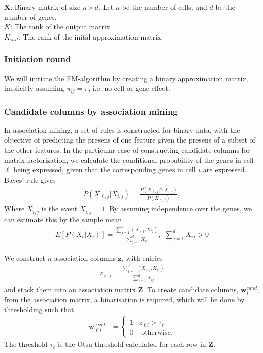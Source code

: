 \documentclass[12pt]{article}
\begin{document}
 $\mathbf{X}$: Binary matrix of size $n \times d$. Let $n$ be the number of cells, and $d$ be the number of genes.\\
$K$: The rank of the output matrix. \\
$K_{init}$: The rank of the inital approximation matrix.

\subsubsection{Initiation round} %
We will initiate the EM-algorithm by creating a binary approximation matrix, implicitly assuming $\pi_{ij} = \pi$, i.e. no cell or gene effect.

\subsubsection*{Candidate columns by association mining} %

In association mining\cite{Agrawal1993Mining}, a set of rules is constructed for binary data, with the objective of predicting the presens of one feature given the presens of a subset of the other features. 
In the particular case of constructing candidate columns for matrix factorization, we calculate the conditional probability of the genes in cell $\ell$ being expressed, given that the corresponding genes in cell $i$ are expressed. 
Bayes' rule gives
\begin{align}
  P(X_{\ell,j}|X_{i,j}) = \frac{P(X_{\ell,j} \cap X_{i,j})}{P(X_{\ell,j})}, 
\end{align}
Where $X_{i,j}$ is the event $X_{i,j} = 1$.
By assuming independence over the genes, we can estimate this by the sample mean 
\begin{align}
  E [ P(X_{\ell}| X_{i})] =  \frac{\sum_{j = 1}^ d (X_{\ell j}, X_{i j})}{\sum_{j = 1}^ d X_{i j}}, \, \, \sum_{j = 1}^ d X_{i j} > 0
\end{align}

We construct $n$ association columns $\mathbf{z}_i$ with entries
\begin{align}
  z_{\ell, i} = \frac{\sum_{j = 1}^ d (X_{\ell j}, X_{i j})}{\sum_{j = 1}^ d X_{i j}}
\end{align}
and stack them into an association matrix $\mathbf{Z}$.
To create candidate columns, $\mathbf{w}^{cand}_{ i}$,  from the association matrix, a binarisation is required, which will be done by thresholding such that
\begin{align}
  \mathbf{w}^{cand}_{\ell i}&  = 
  \begin{cases}
   1 &  z_{\ell i}  > \tau_\ell \\
   0 & \text{ otherwise.}
  \end{cases}
\end{align}
The threshold $\tau_\ell$ is the Otsu threshold \cite{Otsu1979Threshold} calculated for each row in $\mathbf{Z}$.
\end{document}
